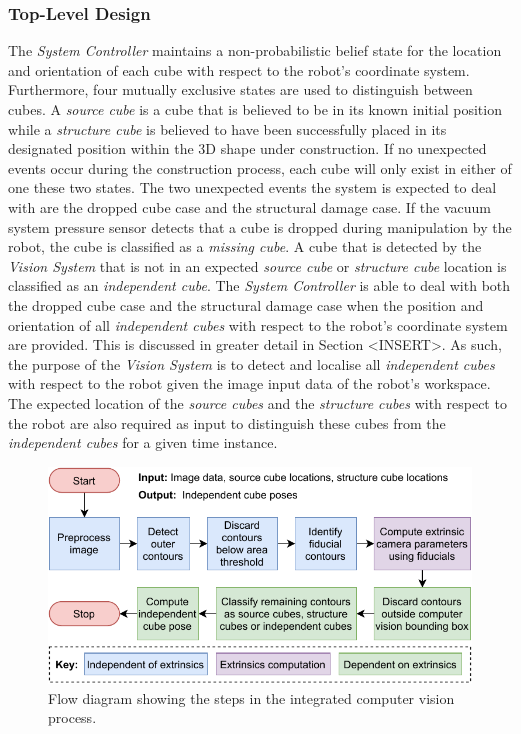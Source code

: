 
\subsubsection{Top-Level Design} \label{sec:Top-Level Design}

The \textit{System Controller} maintains a non-probabilistic belief state for the location and orientation of each cube with respect to the robot's coordinate system. Furthermore, four mutually exclusive states are used to distinguish between cubes. A \textit{source cube} is a cube that is believed to be in its known initial position while a \textit{structure cube} is believed to have been successfully placed in its designated position within the 3D shape under construction. If no unexpected events occur during the construction process, each cube will only exist in either of one these two states. The two unexpected events the system is expected to deal with are the dropped cube case and the structural damage case. If the vacuum system pressure sensor detects that a cube is dropped during manipulation by the robot, the cube is classified as a \textit{missing cube}. A cube that is detected by the \textit{Vision System} that is not in an expected \textit{source cube} or \textit{structure cube} location is classified as an \textit{independent cube}. The \textit{System Controller} is able to deal with both the dropped cube case and the structural damage case when the position and orientation of all \textit{independent cubes} with respect to the robot's coordinate system are provided. This is discussed in greater detail in Section <INSERT>. As such, the purpose of the \textit{Vision System} is to detect and localise all \textit{independent cubes} with respect to the robot given the image input data of the robot's workspace. The expected location of the \textit{source cubes} and the \textit{structure cubes} with respect to the robot are also required as input to distinguish these cubes from the \textit{independent cubes} for a given time instance.


\begin{figure}[!ht]
	\centering
	\includegraphics[width=0.8\linewidth]{figures/high-level-computer-vision-design.pdf}
	\caption{Flow diagram showing the steps in the integrated computer vision process.}
	\label{fig:high-level-computer-vision-design}
\end{figure}

